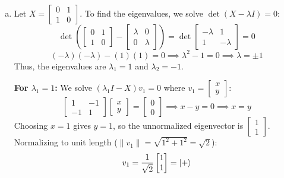 \documentclass{article}
\begin{document}
\begin{enumerate}[(a)]
    \item Let $X = \begin{bmatrix} 0 & 1 \\ 1 & 0 \end{bmatrix}$. To find the eigenvalues, we solve $\det(X - \lambda I) = 0$:
    \[
    \det \left( \begin{bmatrix} 0 & 1 \\ 1 & 0 \end{bmatrix} - \begin{bmatrix} \lambda & 0 \\ 0 & \lambda \end{bmatrix} \right) = \det \begin{bmatrix} -\lambda & 1 \\ 1 & -\lambda \end{bmatrix} = 0
    \]
    \[
    (-\lambda)(-\lambda) - (1)(1) = 0 \implies \lambda^2 - 1 = 0 \implies \lambda = \pm 1
    \]
    Thus, the eigenvalues are $\lambda_1 = 1$ and $\lambda_2 = -1$.

    \textbf{For $\lambda_1 = 1$:}
    We solve $(\lambda_1 I - X)v_1 = 0$ where $v_1 = \begin{bmatrix} x \\ y \end{bmatrix}$:
    \[
    \begin{bmatrix} 1 & -1 \\ -1 & 1 \end{bmatrix} \begin{bmatrix} x \\ y \end{bmatrix} = \begin{bmatrix} 0 \\ 0 \end{bmatrix} \implies x - y = 0 \implies x = y
    \]
    Choosing $x = 1$ gives $y = 1$, so the unnormalized eigenvector is $\begin{bmatrix} 1 \\ 1 \end{bmatrix}$. Normalizing to unit length ($\|v_1\| = \sqrt{1^2 + 1^2} = \sqrt{2}$):
    \[
    v_1 = \frac{1}{\sqrt{2}} \begin{bmatrix} 1 \\ 1 \end{bmatrix} = \ket{+}
    \]


\end{enumerate}
\end{document}
